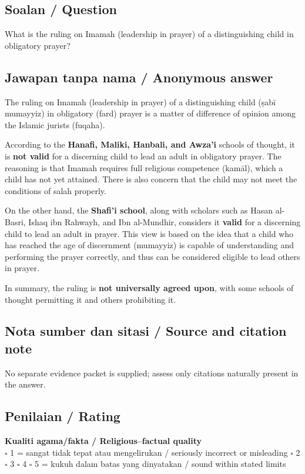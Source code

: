 \documentclass[11pt,a4paper]{article}
\begin{document}
\subsection*{Soalan / Question}
What is the ruling on Imamah (leadership in prayer) of a distinguishing child in obligatory prayer?

\subsection*{Jawapan tanpa nama / Anonymous answer}
The ruling on Imamah (leadership in prayer) of a distinguishing child (ṣabī mumayyiz) in obligatory (fard) prayer is a matter of difference of opinion among the Islamic jurists (fuqaha).\par\medskip According to the \textbf{Hanafi, Maliki, Hanbali, and Awza'i} schools of thought, it is \textbf{not valid} for a discerning child to lead an adult in obligatory prayer. The reasoning is that Imamah requires full religious competence (kamāl), which a child has not yet attained. There is also concern that the child may not meet the conditions of salah properly.\par\medskip On the other hand, the \textbf{Shafi'i school}, along with scholars such as Hasan al-Basri, Ishaq ibn Rahwayh, and Ibn al-Mundhir, considers it \textbf{valid} for a discerning child to lead an adult in prayer. This view is based on the idea that a child who has reached the age of discernment (mumayyiz) is capable of understanding and performing the prayer correctly, and thus can be considered eligible to lead others in prayer.\par\medskip In summary, the ruling is \textbf{not universally agreed upon}, with some schools of thought permitting it and others prohibiting it.

\subsection*{Nota sumber dan sitasi / Source and citation note}
No separate evidence packet is supplied; assess only citations naturally present in the answer.

\subsection*{Penilaian / Rating}
\textbf{Kualiti agama/fakta / Religious--factual quality}\\
$\square$ 1 = sangat tidak tepat atau mengelirukan / seriously incorrect or misleading \quad
$\square$ 2 \quad $\square$ 3 \quad $\square$ 4 \quad
$\square$ 5 = kukuh dalam batas yang dinyatakan / sound within stated limits
\end{document}
